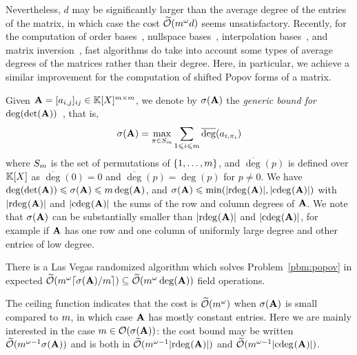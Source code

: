 \documentclass[preprint]{sig-alternate-05-2015}
\begin{document}
Nevertheless, $d$ may be significantly larger than the average degree of the
entries of the matrix, in which case the cost $\widetilde{\mathcal{O}}(m^\omega d)$
seems unsatisfactory. Recently, for the computation of order
bases~\cite{Storjohann06,ZhoLab12}, nullspace bases~\cite{ZhLaSt12},
interpolation bases~\cite{JeNeScVi15,JeNeScVi16}, and matrix
inversion~\cite{ZhLaSt15}, fast algorithms do take into account some types of
average degrees of the matrices rather than their degree. Here, in particular,
we achieve a similar improvement for the computation of shifted Popov forms of
a matrix.

Given $\mat{A} = [a_{i,j}]_{ij} \in \polMatSpace[\rdim]$, we denote by
$\degDet$ the \emph{generic bound for
  $\deg(\det(\mat{A}))$}~\cite[Section~6]{GuSaStVa12}, that is,
\begin{equation}
  \label{eqn:degDet}
  \degDet = \max_{\pi \in S_\rdim} \sum_{1 \le i\le \rdim} \overline{\deg}(a_{i,\pi_i})
\end{equation}
where $S_m$ is the set of permutations of $\{1,\ldots,m\}$, and
$\overline{\deg}(p)$ is defined over $\mathbb{K}[X]$ as $\overline{\deg}(0) = 0$ and
$\overline{\deg}(p) = \deg(p)$ for $p\neq 0$. We have $\deg(\det(\mat{A})) \le
\degDet \le \rdim \deg(\mat{A})$, and $\degDet \le
\min(\sumVec{\rdeg{\mat{A}}}, \sumVec{\cdeg{\mat{A}}})$ with
$\sumVec{\rdeg{\mat{A}}}$ and $\sumVec{\cdeg{\mat{A}}}$ the sums of the row and
column degrees of $\mat{A}$. We note that $\degDet$ can be substantially
smaller than $\sumVec{\rdeg{\mat{A}}}$ and $\sumVec{\cdeg{\mat{A}}}$, for
example if $\mat{A}$ has one row and one column of uniformly large degree and
other entries of low degree.

\begin{thm}
  \label{thm:popov}
  There is a Las Vegas randomized algorithm which solves
  Problem~\ref{pbm:popov} in expected $\softO{\rdim^\expmatmul
  \lceil\degDet/\rdim\rceil} \linebreak[0] \subseteq \softO{\rdim^\expmatmul
    \deg(\mat{A})}$ field operations.
\end{thm}

The ceiling function indicates that the cost is $\widetilde{\mathcal{O}}(m^\omega)$ when
$\degDet$ is small compared to $m$, in which case $\mat{A}$ has mostly
constant entries. Here we are mainly interested in the case $\rdim \in
\bigO{\degDet}$: the cost bound may be written $\softO{\rdim^{\expmatmul-1}
\degDet}$ and is both in $\softO{\rdim^{\expmatmul-1} \sumVec{\rdeg{\mat{A}}}}$
and $\softO{\rdim^{\expmatmul-1} \sumVec{\cdeg{\mat{A}}}}$.
\end{document}
